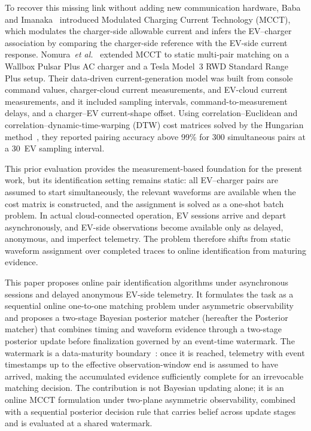 \documentclass{ieeeaccess}
\begin{document}
    To recover this missing link without adding new communication hardware, Baba and Imanaka~\cite{b13} introduced Modulated Charging Current Technology (MCCT), which modulates the charger-side allowable current and infers the EV--charger association by comparing the charger-side reference with the EV-side current response.
    Nomura~\textit{et al.}~\cite{b14} extended MCCT to static multi-pair matching on a Wallbox Pulsar Plus AC charger and a Tesla Model~3 RWD Standard Range Plus setup.
    Their data-driven current-generation model was built from console command values, charger-cloud current measurements, and EV-cloud current measurements, and it included sampling intervals, command-to-measurement delays, and a charger--EV current-shape offset.
    Using correlation--Euclidean and correlation--dynamic-time-warping (DTW) cost matrices solved by the Hungarian method~\cite{b15}, they reported pairing accuracy above 99\% for 300 simultaneous pairs at a 30\, EV sampling interval.

    This prior evaluation provides the measurement-based foundation for the present work, but its identification setting remains static: all EV--charger pairs are assumed to start simultaneously, the relevant waveforms are available when the cost matrix is constructed, and the assignment is solved as a one-shot batch problem.
    In actual cloud-connected operation, EV sessions arrive and depart asynchronously, and EV-side observations become available only as delayed, anonymous, and imperfect telemetry.
    The problem therefore shifts from static waveform assignment over completed traces to online identification from maturing evidence.

    This paper proposes online pair identification algorithms under asynchronous sessions and delayed anonymous EV-side telemetry.
    It formulates the task as a sequential online one-to-one matching problem under asymmetric observability and proposes a two-stage Bayesian posterior matcher (hereafter the Posterior matcher) that combines timing and waveform evidence through a two-stage posterior update before finalization governed by an event-time watermark. The watermark is a data-maturity boundary~\cite{b26}: once it is reached, telemetry with event timestamps up to the effective observation-window end is assumed to have arrived, making the accumulated evidence sufficiently complete for an irrevocable matching decision.
    The contribution is not Bayesian updating alone; it is an online MCCT formulation under two-plane asymmetric observability, combined with a sequential posterior decision rule that carries belief across update stages and is evaluated at a shared watermark.
\end{document}
